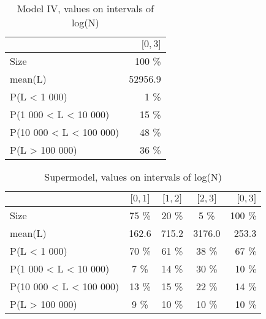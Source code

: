 \documentclass[numbered]{CSL}
\begin{document}
\setlength{\tabcolsep}{0.5em}
\begin{table}
\centering
\caption{Model IV, values on intervals of log(N) \label{table:NModelIV}}
\begin{tabular}{l||r}
\toprule
{} & \small{$\lbrack 0, 3 \rbrack$} \\
\midrule
Size                    &              100 \% \\
mean(L)                 &            52956.9 \\
P(L < 1 000)            &                1 \% \\
P(1 000 < L < 10 000)   &               15 \% \\
P(10 000 < L < 100 000) &               48 \% \\
P(L > 100 000)          &               36 \% \\
\bottomrule
\end{tabular}
\end{table}

\setlength{\tabcolsep}{0.5em}
\begin{table}
\centering
\caption{Supermodel, values on intervals of log(N) \label{table:NSupermodel}}
\begin{tabular}{l|ccc|r}
\toprule
{} & \small{$\lbrack 0, 1 \rbrack$} & \small{$\lbrack 1, 2 \rbrack$} & \small{$\lbrack 2, 3 \rbrack$} & \small{$\lbrack 0, 3 \rbrack$} \\
\midrule
Size                    &               75 \% &               20 \% &                5 \% &              100 \% \\
mean(L)                 &              162.6 &              715.2 &             3176.0 &              253.3 \\
P(L < 1 000)            &               70 \% &               61 \% &               38 \% &               67 \% \\
P(1 000 < L < 10 000)   &                7 \% &               14 \% &               30 \% &               10 \% \\
P(10 000 < L < 100 000) &               13 \% &               15 \% &               22 \% &               14 \% \\
P(L > 100 000)          &                9 \% &               10 \% &               10 \% &               10 \% \\
\bottomrule
\end{tabular}
\end{table}
\end{document}
